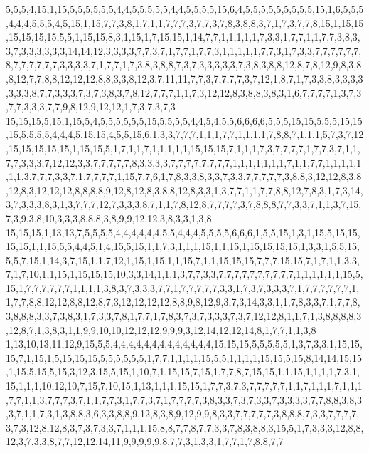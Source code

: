 5,5,5,4,15,1,15,5,5,5,5,5,5,4,4,5,5,5,5,5,4,4,5,5,5,5,15,6,4,5,5,5,5,5,5,5,5,5,15,1,6,5,5,5,4,4,4,5,5,5,4,5,15,1,15,7,7,3,8,1,7,1,1,7,7,7,3,7,7,3,7,8,3,8,8,3,7,1,7,3,7,7,8,15,1,15,15,15,15,15,15,5,5,1,15,15,8,3,1,15,1,7,15,15,1,14,7,7,1,1,1,1,1,7,3,3,1,7,7,1,1,7,7,3,8,3,3,7,3,3,3,3,3,3,14,14,12,3,3,3,3,7,7,3,7,1,7,7,1,7,7,3,1,1,1,1,1,7,7,3,1,7,3,3,7,7,7,7,7,7,8,7,7,7,7,7,7,3,3,3,3,7,1,7,7,1,7,3,8,3,8,8,7,3,7,3,3,3,3,3,7,3,8,3,8,8,12,8,7,8,12,9,8,3,8,8,12,7,7,8,8,12,12,12,8,8,3,3,8,12,3,7,11,11,7,7,3,7,7,7,7,3,7,12,1,8,7,1,7,3,3,8,3,3,3,3,3,3,3,8,7,7,3,3,3,7,3,7,3,8,3,7,8,12,7,7,7,1,1,7,3,12,12,8,3,8,8,3,8,3,1,6,7,7,7,7,1,3,7,3,7,7,3,3,3,7,7,9,8,12,9,12,12,1,7,3,7,3,7,3
15,15,15,5,15,1,15,5,4,5,5,5,5,5,5,15,5,5,5,5,4,4,5,4,5,5,6,6,6,6,5,5,5,15,15,5,5,5,15,15,15,5,5,5,5,4,4,4,5,15,15,4,5,5,15,6,1,3,3,7,7,7,1,1,1,7,7,1,1,1,1,7,8,8,7,1,1,1,5,7,3,7,12,15,15,15,15,15,1,15,15,5,1,7,1,1,7,1,1,1,1,1,15,15,15,7,1,1,1,7,3,7,7,7,7,1,7,7,3,7,1,1,7,7,3,3,3,7,12,12,3,3,7,7,7,7,7,8,3,3,3,3,7,7,7,7,7,7,7,7,1,1,1,1,1,1,1,7,1,1,7,7,1,1,1,1,1,1,1,3,7,7,7,3,3,7,1,7,7,7,7,1,15,7,7,6,1,7,8,3,3,8,3,3,7,3,3,7,7,7,7,7,3,8,8,3,12,12,8,3,8,12,8,3,12,12,12,8,8,8,8,9,12,8,12,8,3,8,8,12,8,3,3,1,3,7,7,1,1,7,7,8,8,12,7,8,3,1,7,3,14,3,7,3,3,3,8,3,1,3,7,7,7,12,7,3,3,3,8,7,1,1,7,8,12,8,7,7,7,7,3,7,8,8,8,7,7,3,3,7,1,1,3,7,15,7,3,9,3,8,10,3,3,3,8,8,8,3,8,9,9,12,12,3,8,3,3,1,3,8
15,15,15,1,13,13,7,5,5,5,5,4,4,4,4,4,4,5,5,4,4,4,5,5,5,5,6,6,6,1,5,5,15,1,3,1,15,5,15,15,15,15,1,1,15,5,5,4,4,5,1,4,15,5,15,1,1,7,3,1,1,1,15,1,1,15,1,15,15,15,15,1,3,3,1,5,5,15,5,5,7,15,1,14,3,7,15,1,1,7,12,1,15,1,15,1,1,15,7,1,1,15,15,15,7,7,7,15,15,7,1,7,1,1,3,3,7,1,7,10,1,1,15,1,15,15,15,10,3,3,14,1,1,1,3,7,7,3,3,7,7,7,7,7,7,7,7,7,7,1,1,1,1,1,1,15,5,15,1,7,7,7,7,7,7,1,1,1,1,3,8,3,7,3,3,3,7,7,1,7,7,7,7,7,3,3,1,7,3,7,3,3,3,7,1,7,7,7,7,7,7,1,1,7,7,8,8,12,12,8,8,12,8,7,3,12,12,12,12,8,8,9,8,12,9,3,7,3,14,3,3,1,1,7,8,3,3,7,1,7,7,8,3,8,8,8,3,3,7,3,8,3,1,7,3,3,7,8,1,7,7,1,7,8,3,7,3,7,3,3,3,7,3,7,12,12,8,1,1,7,1,3,8,8,8,8,3,12,8,7,1,3,8,3,1,1,9,9,10,10,12,12,12,9,9,9,3,12,14,12,12,14,8,1,7,7,1,1,3,8
1,13,10,13,11,12,9,15,5,5,4,4,4,4,4,4,4,4,4,4,4,4,4,15,15,15,5,5,5,5,5,1,3,7,3,3,1,15,15,15,7,1,15,1,5,15,15,15,5,5,5,5,5,5,1,7,7,1,1,1,1,15,5,5,1,1,1,1,15,15,5,15,8,14,14,15,15,1,15,5,15,5,15,3,12,3,15,5,15,1,10,7,1,15,15,7,15,1,7,7,8,7,15,15,1,1,15,1,1,1,1,7,3,1,15,1,1,1,10,12,10,7,15,7,10,15,1,13,1,1,1,15,15,1,7,7,3,7,3,7,7,7,7,7,1,1,7,1,1,1,7,1,1,1,7,7,1,1,3,7,7,7,3,7,1,1,7,7,3,1,7,7,3,7,1,7,7,7,7,3,8,3,3,7,3,7,3,3,7,3,3,3,3,7,7,8,8,3,8,3,3,7,1,1,7,3,1,3,8,8,3,6,3,3,8,8,9,12,8,3,8,9,12,9,9,8,3,3,7,7,7,7,7,3,8,8,8,7,3,3,7,7,7,7,3,7,3,12,8,12,8,3,7,3,7,3,3,7,1,1,1,15,8,8,7,7,8,7,7,3,3,7,8,3,8,8,3,15,5,1,7,3,3,3,12,8,8,12,3,7,3,3,8,7,7,12,12,14,11,9,9,9,9,9,8,7,7,3,1,3,3,1,7,7,1,7,8,8,7,7
